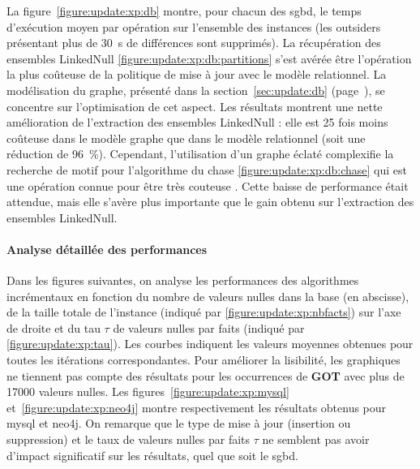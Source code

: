 La figure~\ref{figure:update:xp:db} montre, pour chacun des \gls{sgbd}, le temps d'exécution moyen par opération sur l'ensemble des instances (les outsiders présentant plus de \SI{30}{\s} de différences sont supprimés).
La récupération des ensembles \textsf{LinkedNull} \ref{figure:update:xp:db:partitions} s'est avérée être l'opération la plus coûteuse de la politique de mise à jour avec le modèle relationnel.
La modélisation du graphe, présenté dans la section~\ref{sec:update:db} (page~\pageref{sec:update:db}), se concentre sur l'optimisation de cet aspect.
Les résultats montrent une nette amélioration de l'extraction des ensembles \textsf{LinkedNull} : elle est \num{25} fois moins coûteuse dans le modèle graphe que dans le modèle relationnel (soit une réduction de \SI{96}{\percent}).
Cependant, l'utilisation d'un graphe éclaté complexifie la recherche de motif pour l'algorithme du \gls{chase} \ref{figure:update:xp:db:chase} qui est une opération connue pour être très couteuse \cite{benediktBenchmarkingChase2017}.
Cette baisse de performance était attendue, mais elle s'avère plus importante que le gain obtenu sur l'extraction des ensembles \textsf{LinkedNull}.

\paragraph{Analyse détaillée des performances}
Dans les figures suivantes, on analyse les performances des algorithmes incrémentaux en fonction du nombre de valeurs nulles dans la base (en abscisse), de la taille totale de l'instance (indiqué par \ref{figure:update:xp:nbfacts}) sur l'axe de droite et du tau $\tau$ de valeurs nulles par faits (indiqué par \ref{figure:update:xp:tau}).
Les courbes indiquent les valeurs moyennes obtenues pour toutes les itérations correspondantes.
Pour améliorer la lisibilité, les graphiques ne tiennent pas compte des résultats pour les occurrences de \textbf{GOT} avec plus de \num{17000} valeurs nulles.
Les figures~\ref{figure:update:xp:mysql} et~\ref{figure:update:xp:neo4j} montre respectivement les résultats obtenus pour \gls{mysql} et \gls{neo4j}.
On remarque que le type de mise à jour (insertion ou suppression) et le taux de valeurs nulles par faits $\tau$ ne semblent pas avoir d'impact significatif sur les résultats, quel que soit le \gls{sgbd}.

